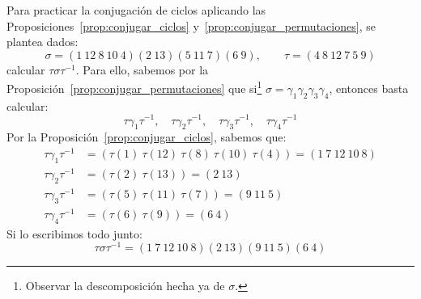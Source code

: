 \begin{ejemplo}
    Para practicar la conjugación de ciclos aplicando las Proposiciones~\ref{prop:conjugar_ciclos} y~\ref{prop:conjugar_permutaciones}, se plantea dados:
    \begin{equation*}
        \sigma = (1\ 12\ 8\ 10\ 4)(2\ 13)(5\ 11\ 7)(6\ 9),\qquad \tau = (4\ 8\ 12\ 7\ 5\ 9)
    \end{equation*}
    calcular $\tau \sigma \tau^{-1}$. Para ello, sabemos por la Proposición~\ref{prop:conjugar_permutaciones} que si\footnote{Observar la descomposición hecha ya de $\sigma$.} $\sigma=\gamma_1\gamma_2\gamma_3\gamma_4$, entonces basta calcular:
    \begin{equation*}
        \tau\gamma_1\tau^{-1},\quad\tau\gamma_2\tau^{-1},\quad\tau\gamma_3\tau^{-1},\quad\tau\gamma_4\tau^{-1}
    \end{equation*}
    Por la Proposición~\ref{prop:conjugar_ciclos}, sabemos que:
    \begin{align*}
        \tau\gamma_1\tau^{-1} &= (\tau(1)\ \tau(12)\ \tau(8)\ \tau(10)\ \tau(4)) = (1\ 7\ 12\ 10\ 8) \\
        \tau\gamma_2\tau^{-1} &= (\tau(2)\ \tau(13)) = (2\ 13) \\
        \tau\gamma_3\tau^{-1} &= (\tau(5)\ \tau(11)\ \tau(7)) = (9\ 11\ 5) \\
        \tau\gamma_4\tau^{-1} &= (\tau(6)\ \tau(9)) = (6\ 4)
    \end{align*}
    Si lo escribimos todo junto:
    \begin{equation*}
        \tau\sigma\tau^{-1} = (1\ 7\ 12\ 10\ 8)(2\ 13)(9\ 11\ 5)(6\ 4)
    \end{equation*}
\end{ejemplo}


